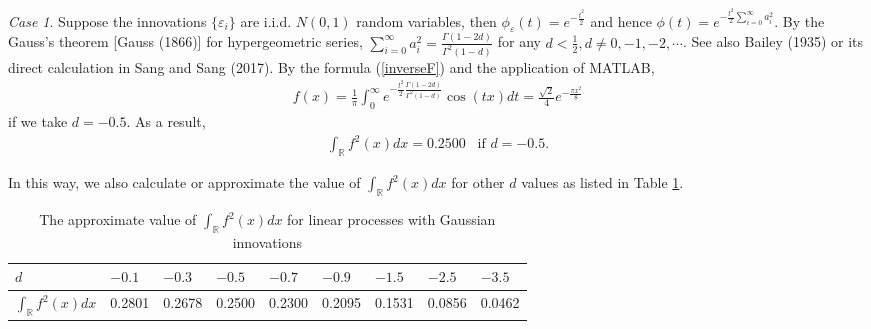 \documentclass[11pt]{article}
\begin{document}
{\it Case 1}. Suppose the innovations $\{\varepsilon_i\}$ are i.i.d. $N(0,1)$ random variables, then $\phi_\varepsilon(t)=e^{-\frac{t^2}{2}}$ and hence
$\phi(t)=e^{-\frac{t^2}{2}\sum_{i=0}^\infty a_i^2}$.   By the Gauss's theorem [Gauss (1866)] for hypergeometric series,  
$\sum_{i=0}^{\infty} a^2_i=\frac{\Gamma(1-2d)}{\Gamma^2(1-d)}$ for any $d<\frac{1}{2}, d\ne 0, -1, -2, \cdots$. See also Bailey (1935) or its direct calculation in Sang and Sang (2017).    
By the formula (\ref{inverseF}) and the application of MATLAB,
\begin{align*}
f(x)=\frac{1}{\pi}\int_{0}^{\infty}e^{-\frac{t^2}{2}\frac{\Gamma(1-2d)}{\Gamma^2(1-d)}} \cos (tx)dt=\frac{\sqrt{2}}{4}e^{-\frac{\pi x^2}{8}}
\end{align*}
if we take $d=-0.5$.
As a result,
\begin{align*}
\int_\mathbb{R} f^2(x)dx=0.2500\;\;\;\text{if $d=-0.5$}.
\end{align*}

In this way, we also calculate or approximate the value of $\int_\mathbb{R} f^2(x)dx$ for other $d$ values as listed in Table \ref{tab1}. 
\begin{table}[H]%
\center
\caption{ The approximate value of $\int_\mathbb{R} f^2(x)dx$ for linear processes with Gaussian innovations} 
\label{tab1}
\bigskip
\begin{tabular}{| l | l | l | l | l | l | l | l | l |}
\hline                                                     
\;\;$d$                                          & $-0.1$  & $-0.3$ &  $-0.5$ &  $-0.7$ &  $-0.9$ &  $-1.5$&  $-2.5$ &  $-3.5$\\
\hline

\;\;$\int_\mathbb{R} f^2(x)dx$ & 0.2801 & 0.2678 & 0.2500 & 0.2300 & 0.2095 &0.1531 &  0.0856 & 0.0462 \\
\hline
\end{tabular}  
\end{table}
\end{document}

